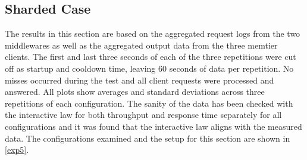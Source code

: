 \documentclass[11pt,a4paper]{article}
\begin{document}
\subsection{Sharded Case} \label{sec5.1}

The results in this section are based on the aggregated request logs from the two middlewares as well as the aggregated output data from the three memtier clients. The first and last three seconds of each of the three repetitions were cut off as startup and cooldown time, leaving 60 seconds of data per repetition. No misses occurred during the test and all client requests were processed and answered. All plots show averages and standard deviations across three repetitions of each configuration. The sanity of the data has been checked with the interactive law for both throughput and response time separately for all configurations and it was found that the interactive law aligns with the measured data. The configurations examined and the setup for this section are shown in \autoref{exp5}.
\end{document}
